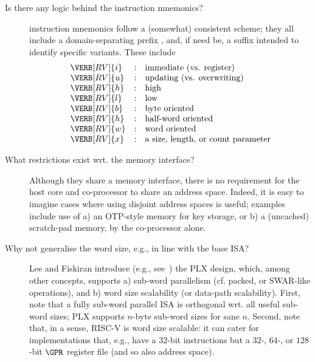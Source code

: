 \begin{description}

\item[Is there any logic behind the \XCID instruction mnemonics?]
      \XCID instruction mnemonics follow a (somewhat) consistent scheme; 
      they all include a domain-separating prefix , and, if
      need be, a suffix intended to identify specific variants.  These 
      include
      \[
      \begin{array}{lcl}
      \VERB[RV]{i} &:& \mbox{immediate (vs. register)   }        \\
      \VERB[RV]{u} &:& \mbox{updating  (vs. overwriting)}        \\
      \VERB[RV]{h} &:& \mbox{high}                               \\
      \VERB[RV]{l} &:& \mbox {low}                               \\
      \VERB[RV]{b} &:& \mbox     {byte oriented}                 \\
      \VERB[RV]{h} &:& \mbox{half-word oriented}                 \\
      \VERB[RV]{w} &:& \mbox     {word oriented}                 \\
      \VERB[RV]{x} &:& \mbox{a size, length, or count parameter} \\
      \end{array}
      \]

\item[What restrictions exist wrt. the \XCID memory interface?]
      Although they share a memory interface, there is no requirement for
      the host core and co-processor to share an address space.  Indeed,
      it is easy to imagine cases where using disjoint address spaces is
      useful; examples include use of
      a) an OTP-style memory for key storage, 
         or
      b) a (uncached) scratch-pad memory,
      by the co-processor alone.

\item[Why not generalise the \XCID word size, e.g., in line with the base ISA?]
      Lee and Fiskiran introduce (e.g., see~\cite{SCARV:LeeFis:05}) the PLX
      design, which, among other concepts, supports 
      a) sub-word parallelism (cf. packed, or SWAR-like operations),
         and
      b) word size scalability (or data-path scalability).
      First, 
      note that a fully sub-word parallel ISA is orthogonal wrt. all useful
      sub-word sizes; PLX supports $n$-byte sub-word sizes for sane $n$.
      Second,
      note that, in a sense, RISC-V is word size scalable: it can cater for
      implementations that, e.g., have a $32$-bit instructions but a $32$-,
      $64$-, or $128$-bit $\GPR$ register file (and so also address space). 


\end{description}
